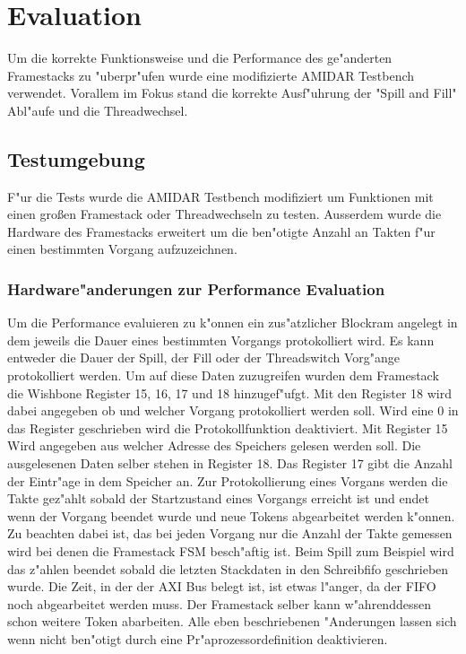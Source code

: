 \chapter{Evaluation}
\label{cha:Evaluation}
Um die korrekte Funktionsweise und die Performance des ge"anderten Framestacks zu "uberpr"ufen wurde eine modifizierte AMIDAR Testbench verwendet. Vorallem im Fokus stand die korrekte Ausf"uhrung der "Spill and Fill" Abl"aufe und die Threadwechsel. 
\section{Testumgebung}
F"ur die Tests wurde die AMIDAR Testbench modifiziert um Funktionen mit einen großen Framestack oder Threadwechseln zu testen. Au{ss}erdem wurde die Hardware des Framestacks erweitert um die ben"otigte Anzahl an Takten f"ur einen bestimmten Vorgang aufzuzeichnen. 
\subsection{Hardware"anderungen zur Performance Evaluation}
Um die Performance evaluieren zu k"onnen ein zus"atzlicher Blockram angelegt in dem jeweils die Dauer eines bestimmten Vorgangs protokolliert wird. Es kann entweder die Dauer der Spill, der Fill oder der Threadswitch Vorg"ange protokolliert werden. 
Um auf diese Daten zuzugreifen wurden dem Framestack die Wishbone Register 15, 16, 17 und 18 hinzugef"ufgt. Mit den Register 18 wird dabei angegeben ob und welcher Vorgang protokolliert werden soll. Wird eine 0 in das Register geschrieben wird die Protokollfunktion deaktiviert. Mit Register 15 Wird angegeben aus welcher Adresse des Speichers gelesen werden soll. Die ausgelesenen Daten selber stehen in Register 18. Das Register 17 gibt die Anzahl der Eintr"age in dem Speicher an. 
Zur Protokollierung eines Vorgans werden die Takte gez"ahlt sobald der Startzustand eines Vorgangs erreicht ist und endet wenn der Vorgang beendet wurde und neue Tokens abgearbeitet werden k"onnen. Zu beachten dabei ist, das bei jeden Vorgang nur die Anzahl der Takte gemessen wird bei denen die Framestack FSM besch"aftig ist. Beim Spill zum Beispiel wird das z"ahlen beendet sobald die letzten Stackdaten in den Schreibfifo geschrieben wurde. Die Zeit, in der der AXI Bus belegt ist, ist etwas l"anger, da der FIFO noch abgearbeitet werden muss. Der Framestack selber kann w"ahrenddessen schon weitere Token abarbeiten.
Alle eben beschriebenen "Anderungen lassen sich wenn nicht ben"otigt durch eine Pr"aprozessordefinition deaktivieren. 

